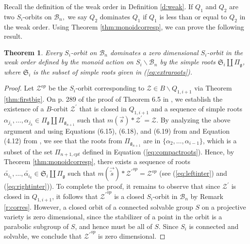 \documentclass[12pt]{amsart}
\numberwithin{equation}{section}
\newtheorem{thm}{Theorem}[section]
\newcommand{\cZ}{{\mathcal Z}}
\newcommand{\fg}{\mbox{${\mathfrak g}$}}
\newcommand{\B}{\mathcal{B}}
\begin{document}
Recall the definition of the weak order in Definition \ref{d:weak}.  If $Q_1$ and $Q_2$ are two $S_i$-orbits on $\B_{n},$  we say $Q_2$ dominates $Q_1$ if $Q_1$ is less than or equal to $Q_2$ in the weak order.  Using Theorem \ref{thm:monoidcorresp}, we can prove the following result.
\begin{thm}\label{thm:Siweak}
Every $S_{i}$-orbit on $\B_{n}$ dominates a zero dimensional $S_{i}$-orbit in the weak order defined by the monoid action on $S_{i}\backslash\B_{n}$ by the simple roots $\mathfrak{S}_i\coprod \Pi_{\fg}$, where $\mathfrak{S}_i$ is the subset of simple roots given in (\ref{eq:extraroots}).  
\end{thm}
\begin{proof}
Let ${\cZ}^{op}$ be the $S_{i}$-orbit corresponding to $\cZ\in B\backslash Q_{1,i+1}$ via Theorem \ref{thm:firstbig}.  On p. 289 of the proof of Theorem 6.5 in \cite{CE21II}, we establish the existence of a $B$-orbit ${\cZ}^{\prime}$ that is closed in $Q_{1,i+1}$ and a sequence of simple roots $\alpha_{j_1}, \dots, \alpha_{j_k} \in \Pi_{\fg}\coprod \Pi_{\fg_{n+1}}$ such that $m(\vec{s})*{\cZ}^{\prime}={\cZ}.$  By analyzing the above argument and using Equations (6.15), (6.18), and (6.19) from \cite{CE21II} and Equation (4.12) from \cite{CE21I}, we see that the roots from $\Pi_{\fg_{n+1}}$ are in $\{\alpha_2, \dots, \alpha_{i-1} \}$, which is a subset of the set $\Pi_{n+1,cpt}$ defined in Equation (\ref{eq:compactroots}).  
Hence, by Theorem \ref{thm:monoidcorresp}, there exists a sequence of roots $\widetilde{\alpha_{i_{1}}}, \dots, \widetilde{\alpha_{i_{k}}}\in \mathfrak{S}_i\coprod\Pi_{\fg}$ such that $m(\vec{\widetilde{s}})*{{\cZ}^{\prime}}^{op}={\cZ}^{op}$ (see (\ref{eq:leftinter}) and (\ref{eq:rightinter})).  
To complete the proof, it remains to observe that since ${\cZ}^{\prime}$ is closed in $Q_{1,i+1}$, it follows that ${{\cZ}^{\prime}}^{op}$ is a closed $S_i$-orbit in $\B_n$ by Remark \ref{r:corres}.  However, a closed orbit of a connected solvable group $S$ on a projective variety is zero dimensional, since the stabilizer of a point in the orbit is a parabolic subgroup of $S$, and hence must be all of $S.$   Since $S_i$ is connected and solvable, we conclude that ${{\cZ}^{\prime}}^{op}$ is zero dimensional.

\end{proof}
\end{document}
